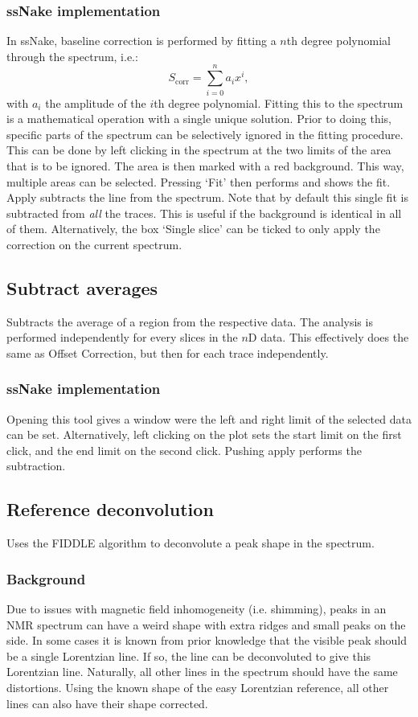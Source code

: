 \documentclass[11pt,a4paper]{article}
\begin{document}
\subsubsection*{ssNake implementation}
In ssNake, baseline correction is performed by fitting a $n$th degree polynomial through the spectrum, i.e.:
\begin{equation*}
S_\text{corr} = \sum_{i=0}^n a_i x^i ,
\end{equation*}
with $a_i$ the amplitude of the $i$th degree polynomial. Fitting this to the spectrum is a mathematical operation with a single unique solution. Prior to doing this, specific parts of the spectrum can be selectively ignored in the fitting procedure. This can be done by left clicking in the spectrum at the two limits of the area that is to be ignored. The area is then marked with a red background. This way, multiple areas can be selected. Pressing  `Fit' then performs and shows the fit. Apply subtracts the line from the spectrum. Note that by default this single fit is subtracted from \textit{all} the traces. This is useful if the background is identical in all of them. Alternatively, the box `Single slice' can be ticked to only apply the correction on the current spectrum.

\subsection{Subtract averages}
Subtracts the average of a region from the respective data. The analysis is performed independently for every slices in the $n$D data. This effectively does the same as Offset Correction, but then for each trace independently.

\subsubsection*{ssNake implementation}
Opening this tool gives a window were the left and right limit of the selected data can be set. Alternatively, left clicking on the plot sets the start limit on the first click, and the end limit on the second click. Pushing apply performs the subtraction.

\subsection{Reference deconvolution}
Uses the FIDDLE algorithm to deconvolute a peak shape in the spectrum.

\subsubsection*{Background}
Due to issues with magnetic field inhomogeneity (i.e. shimming), peaks in an NMR spectrum can have a weird shape with extra ridges and small peaks on the side. In some cases it is known from prior knowledge that the visible peak should be a single Lorentzian line. If so, the line can be deconvoluted to give this Lorentzian line. Naturally, all other lines in the spectrum should have the same distortions. Using the known shape of the easy Lorentzian reference, all other lines can also have their shape corrected.
\end{document}
